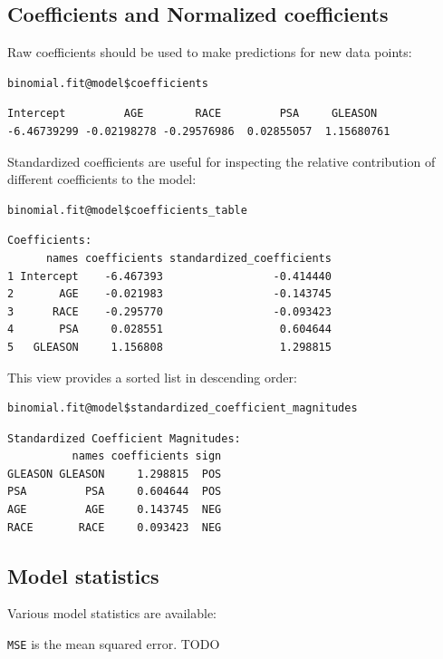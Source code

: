 \subsection{Coefficients and Normalized coefficients}

Raw coefficients should be used to make predictions for new data points:

\begin{lstlisting}[style=R]
binomial.fit@model$coefficients
\end{lstlisting}
\begin{lstlisting}[style=output]
  Intercept         AGE        RACE         PSA     GLEASON 
-6.46739299 -0.02198278 -0.29576986  0.02855057  1.15680761 
\end{lstlisting}

Standardized coefficients are useful for inspecting the relative contribution of different coefficients to the model:

\begin{lstlisting}[style=R]
binomial.fit@model$coefficients_table
\end{lstlisting}
\begin{lstlisting}[style=output]
Coefficients:
      names coefficients standardized_coefficients
1 Intercept    -6.467393                 -0.414440
2       AGE    -0.021983                 -0.143745
3      RACE    -0.295770                 -0.093423
4       PSA     0.028551                  0.604644
5   GLEASON     1.156808                  1.298815
\end{lstlisting}

This view provides a sorted list in descending order:

\begin{lstlisting}[style=R]
binomial.fit@model$standardized_coefficient_magnitudes
\end{lstlisting}
\begin{lstlisting}[style=output]
Standardized Coefficient Magnitudes:
          names coefficients sign
GLEASON GLEASON     1.298815  POS
PSA         PSA     0.604644  POS
AGE         AGE     0.143745  NEG
RACE       RACE     0.093423  NEG
\end{lstlisting}

\subsection{Model statistics}

Various model statistics are available:

\texttt{MSE} is the mean squared error.  TODO

